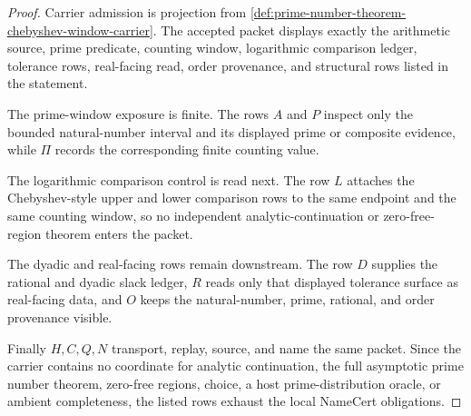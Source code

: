 \begin{proof}
Carrier admission is projection from \autoref{def:prime-number-theorem-chebyshev-window-carrier}. The accepted packet displays exactly the arithmetic source, prime predicate, counting window, logarithmic comparison ledger, tolerance rows, real-facing read, order provenance, and structural rows listed in the statement.

The prime-window exposure is finite. The rows $A$ and $P$ inspect only the bounded natural-number interval and its displayed prime or composite evidence, while $\Pi$ records the corresponding finite counting value.

The logarithmic comparison control is read next. The row $L$ attaches the Chebyshev-style upper and lower comparison rows to the same endpoint and the same counting window, so no independent analytic-continuation or zero-free-region theorem enters the packet.

The dyadic and real-facing rows remain downstream. The row $D$ supplies the rational and dyadic slack ledger, $R$ reads only that displayed tolerance surface as real-facing data, and $O$ keeps the natural-number, prime, rational, and order provenance visible.

Finally $H,C,Q,N$ transport, replay, source, and name the same packet. Since the carrier contains no coordinate for analytic continuation, the full asymptotic prime number theorem, zero-free regions, choice, a host prime-distribution oracle, or ambient completeness, the listed rows exhaust the local NameCert obligations.
\end{proof}

